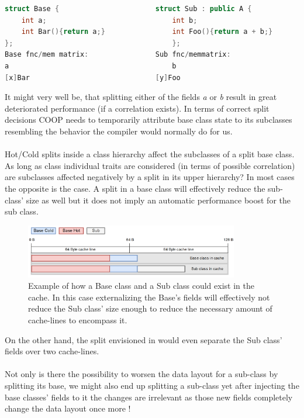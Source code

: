 \begin{lstlisting}[language=C++, name={Function/Member matrices for classes related by inheritance.}, label={inheritance_fmm}]
struct Base {						struct Sub : public A {
	int a;								int b;
	int Bar(){return a;}				int Foo(){return a + b;}
};										};
Base fnc/mem matrix:				Sub fnc/memmatrix:
a										b
[x]Bar								[y]Foo
\end{lstlisting}
It might very well be, that splitting either of the fields \textit{a} or \textit{b} result in great deteriorated performance (if a correlation exists). In terms of correct split decisions COOP needs to temporarily attribute base class state to its subclasses resembling the behavior the compiler would normally do for us.\\\\
Hot/Cold splits inside a class hierarchy affect the subclasses of a split base class. As long as class individual traits are considered (in terms of possible correlation) are subclasses affected negatively by a split in its upper hierarchy? In most cases the opposite is the case. A split in a base class will effectively reduce the sub-class' size as well but it does not imply an automatic performance boost for the sub class.
\begin{figure}[!htbp]
	\centering
	\includegraphics[width=0.83\textwidth,height=0.25\textwidth]{PICs/inheritance_split}
	\caption{Example of how a Base class and a Sub class could exist in the cache. In this case externalizing the Base's fields will effectively not reduce the Sub class' size enough to reduce the necessary amount of cache-lines to encompass it.}
	\label{inheritance_split}
\end{figure}
On the other hand, the split envisioned in  would even separate the Sub class' fields over two cache-lines.\\\\
Not only is there the possibility to worsen the data layout for a sub-class by splitting its base, we might also end up splitting a sub-class yet after injecting the base classes' fields to it the changes are irrelevant as those new fields completely change the data layout once more !
